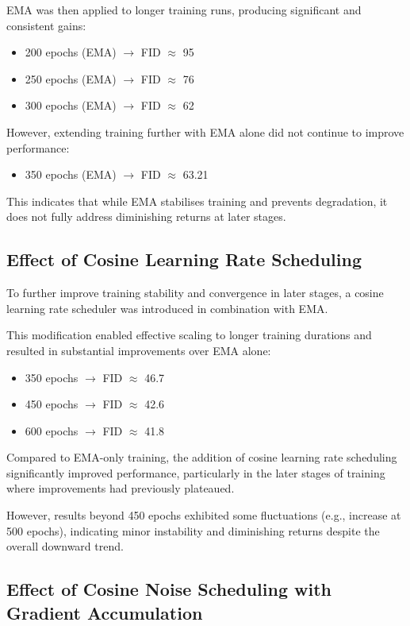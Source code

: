 \documentclass[conference]{IEEEtran}
\begin{document}
EMA was then applied to longer training runs, producing significant and consistent gains:
\begin{itemize}
    \item 200 epochs (EMA) $\rightarrow$ FID $\approx$ 95
    \item 250 epochs (EMA) $\rightarrow$ FID $\approx$ 76
    \item 300 epochs (EMA) $\rightarrow$ FID $\approx$ 62
\end{itemize}

However, extending training further with EMA alone did not continue to improve performance:
\begin{itemize}
    \item 350 epochs (EMA) $\rightarrow$ FID $\approx$ 63.21
\end{itemize}

This indicates that while EMA stabilises training and prevents degradation, it does not fully address diminishing returns at later stages.


\subsection{Effect of Cosine Learning Rate Scheduling}

To further improve training stability and convergence in later stages, a cosine learning rate scheduler was introduced in combination with EMA.

This modification enabled effective scaling to longer training durations and resulted in substantial improvements over EMA alone:
\begin{itemize}
    \item 350 epochs $\rightarrow$ FID $\approx$ 46.7
    \item 450 epochs $\rightarrow$ FID $\approx$ 42.6
    \item 600 epochs $\rightarrow$ FID $\approx$ 41.8
\end{itemize}

Compared to EMA-only training, the addition of cosine learning rate scheduling significantly improved performance, particularly in the later stages of training where improvements had previously plateaued.

However, results beyond 450 epochs exhibited some fluctuations (e.g., increase at 500 epochs), indicating minor instability and diminishing returns despite the overall downward trend.

\subsection{Effect of Cosine Noise Scheduling with Gradient Accumulation}
\end{document}
